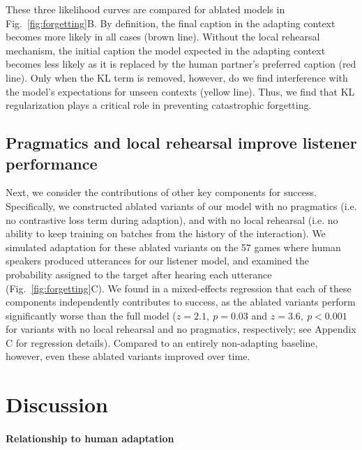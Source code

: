 \documentclass[11pt,a4paper]{article}
\begin{document}
These three likelihood curves are compared for ablated models in Fig.\ \ref{fig:forgetting}B.
By definition, the final caption in the adapting context becomes more likely in all cases (brown line).
Without the local rehearsal mechanism, the initial caption the model expected in the adapting context becomes less likely as it is replaced by the human partner's preferred caption (red line).
Only when the KL term is removed, however, do we find interference with the model's expectations for unseen contexts (yellow line).
Thus, we find that KL regularization plays a critical role in preventing catastrophic forgetting.

\subsection{Pragmatics and local rehearsal improve listener performance}

Next, we consider the contributions of other key components for success.
Specifically, we constructed ablated variants of our model with no pragmatics (i.e. no contrastive loss term during adaption), and with no local rehearsal (i.e. no ability to keep training on batches from the history of the interaction).
We simulated adaptation for these ablated variants on the 57 games where human speakers produced utterances for our listener model, and examined the probability assigned to the target after hearing each utterance (Fig.\ \ref{fig:forgetting}C).
We found in a mixed-effects regression that each of these components independently contributes to success, as the ablated variants perform significantly worse than the full model (${z=2.1,~p = 0.03}$ and ${z=3.6,~p < 0.001}$ for variants with no local rehearsal and no pragmatics, respectively; see Appendix C for regression details). 
Compared to an entirely non-adapting baseline, however, even these ablated variants improved over time.
 
 
\section{Discussion}
\label{sec:discussion}

\paragraph{Relationship to human adaptation}
\end{document}
